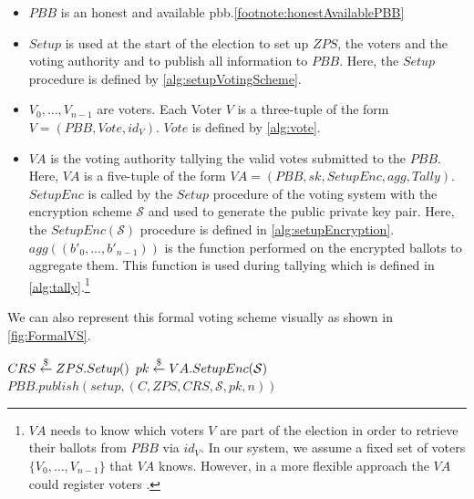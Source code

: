 \begin{definition}
\begin{itemize}
{      %
    }
    \item $PBB$ is an honest and available \gls{pbb}.\cref{footnote:honestAvailablePBB}
    \item $Setup$ is used at the start of the election to set up $ZPS$, the voters and the voting authority and to publish all information to $PBB$.
    Here, the $Setup$ procedure is defined by \cref{alg:setupVotingScheme}.
    \item $V_0,\dots, V_{n-1}$ are voters. 
    Each Voter $V$ is a three-tuple of the form $V=(PBB, Vote, id_V)$. $Vote$ is defined by \cref{alg:vote}.
    \item $VA$ is the voting authority tallying the valid votes submitted to the $PBB$.
    Here, $VA$ is a five-tuple of the form $VA=(PBB, sk, SetupEnc, agg, Tally)$. 
    $SetupEnc$ is called by the $Setup$ procedure of the voting system with the encryption scheme $\mathcal{S}$ and used to generate the public private key pair.
    Here, the $SetupEnc(\mathcal{S})$ procedure is defined in \cref{alg:setupEncryption}. 
    $agg((b'_0, \dots, b'_{n-1}))$ is the function performed on the encrypted ballots to aggregate them. 
    This function is used during tallying which is defined in \cref{alg:tally}.\footnote{\label{footnote:vaRegisterVoters} 
      $VA$ needs to know which voters $V$ are part of the election in order to retrieve their ballots from $PBB$ via $id_V$.
      In our system, we assume a fixed set of voters $\{V_0, \dots, V_{n-1}\}$ that $VA$ knows.
      However, in a more flexible approach the $VA$ could register voters \cite{adida_electing_2009}.
    }
  \end{itemize}
\end{definition}

We can also represent this formal voting scheme visually as shown in \cref{fig:FormalVS}.

\begin{Algorithmus}[h] %
  \caption{Setup of a voting scheme $VS=(C, \mathcal{S}, ZPS, PBB, Setup, \{V_0, \dots, V_{n-1}\}, VA)$}
  \label{alg:setupVotingScheme}
  \begin{algorithmic}
    \State $CRS\overset{\$}{\gets} ZPS.Setup()$
    \State $pk\overset{\$}{\gets} VA.SetupEnc(\mathcal{S})$
    \State $PBB.publish(setup, (C, ZPS, CRS, \mathcal{S}, pk, n))$
  \EndProcedure
  \end{algorithmic}
\end{Algorithmus}

